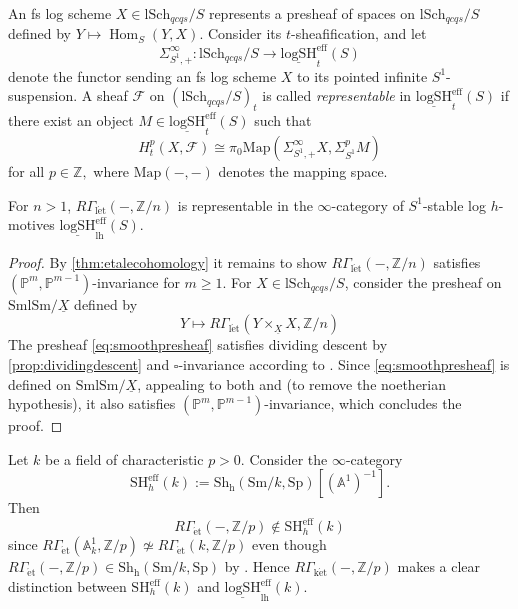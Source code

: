 \documentclass[10pt]{amsart}
\newcommand{\A}{\mathbb{A}}
\renewcommand{\P}{\mathbb{P}}
\newcommand{\Z}{\mathbb{Z}}
\newcommand{\cF}{\mathcal{F}}
\DeclareMathOperator{\Hom}{Hom}
\newcommand{\ul}{\underline}
\newcommand{\ket}{\mathrm{k\acute{e}t}}
\newcommand{\et}{\mathrm{\acute{e}t}}
\newcommand{\h}{\mathrm{h}}
\newcommand{\lh}{\mathrm{lh}}
\newcommand{\letale}{\mathrm{l\acute{e}t}}
\newcommand{\SmlSm}{\mathrm{SmlSm}}
\newcommand{\Sh}{\mathrm{Sh}}
\newcommand{\Sm}{\mathrm{Sm}}
\newcommand{\Sp}{\mathrm{Sp}}
\newcommand{\lSch}{\mathrm{lSch}}
\newcommand{\eff}{\mathrm{eff}}
\newcommand{\logSH}{\mathrm{logSH}}
\newcommand{\SH}{\mathrm{SH}}
\begin{document}
An fs log scheme $X\in \lSch_{qcqs}/S$ represents a presheaf of spaces on $\lSch_{qcqs}/S$ 
defined by $Y \mapsto \Hom_{S}(Y, X).$ 
Consider its $t$-sheafification, 
and let 
$$\Sigma^\infty_{S^1,+} \colon \lSch_{qcqs}/S \to \underline{\logSH}_{t}^\eff(S)$$ 
denote the functor sending an fs log scheme $X$ to its pointed infinite $S^1$-suspension.
A sheaf $\cF$ on $(\lSch_{qcqs}/S)_t$ is called \emph{representable} in 
$\underline{\logSH}_{t}^\eff(S)$ 
if there exist an object $M \in \underline{\logSH}_{t}^\eff(S)$ such that
$$H^{p}_{t}(X, \cF) \cong \pi_0\mathrm{Map}(\Sigma^\infty_{S^1,+} X, \Sigma^p_{S^1} M)$$
for all $p \in \Z,$ where $\mathrm{Map}(-,-)$ denotes the mapping space.

\begin{proposition}\label{prop:Z/nrepresentable}
For $n>1$,
$R\Gamma_\letale(-,\Z/n)$ is representable in the $\infty$-category of $S^1$-stable log $h$-motives
$\ul{\logSH}_{\lh}^\eff(S)$.
\end{proposition}
\begin{proof}
By \cref{thm:etalecohomology} it remains to show 
$R\Gamma_\letale(-,\Z/n)$ satisfies $(\P^m, \P^{m-1})$-invariance for $m\geq 1$.
For $X\in \lSch_{qcqs}/S$,
consider the presheaf on $\SmlSm/\ul{X}$ defined by 
\begin{equation}\label{eq:smoothpresheaf}
Y \longmapsto R\Gamma_{\letale}(Y \times_{\ul{X}} X, \Z/n)
\end{equation}
The presheaf \eqref{eq:smoothpresheaf} satisfies dividing descent by \cref{prop:dividingdescent} 
and $\square$-invariance according to \cite[Lemma 6.9.4]{MR1922832}. 
Since \eqref{eq:smoothpresheaf} is defined on $\SmlSm/\ul{X}$, 
appealing to both 
\cite[Proposition 7.3.1]{logDM} and \cite[Proposition 3.2.18]{logSH} 
(to remove the noetherian hypothesis), 
it also satisfies $(\P^m, \P^{m-1})$-invariance,
which concludes the proof.
\end{proof}


Let $k$ be a field of characteristic $p>0$.
Consider the $\infty$-category
$$\SH_{ h}^\eff(k)
:=
\Sh_\h(\Sm/k,\Sp)[(\A^1)^{-1}].
$$
Then
\[
R\Gamma_{\et}(-,\Z/p)\notin \SH_{h}^\eff(k)
\]
since $R\Gamma_{\et}(\A_k^1,\Z/p)\not\simeq R\Gamma_{\et}(k,\Z/p)$ even though $R\Gamma_\et(-,\Z/p)\in \Sh_\h(\Sm/k,\Sp)$ by
\cite[Proposition 5.2]{MR4278670}.
Hence $R\Gamma_{\ket}(-,\Z/p)$ makes a clear distinction between $\SH_{h}^\eff(k)$ and 
$\ul{\logSH}_{\lh}^\eff(k)$.
\vspace{0.1in}
\end{document}
